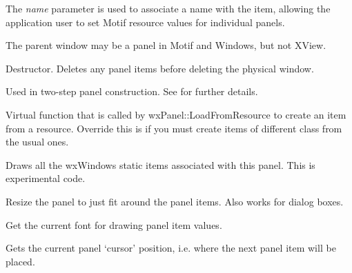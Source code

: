 The {\it name} parameter is used to associate a name with the item,
allowing the application user to set Motif resource values for
individual panels.

The parent window may be a panel in Motif and Windows, but not XView.



Destructor.  Deletes any panel items before deleting the physical window.



Used in two-step panel construction. See 
for further details.



Virtual function that is called by wxPanel::LoadFromResource to create an item from a resource.
Override this is if you must create items of different class from the usual ones.



Draws all the wxWindows static items associated with this panel. This is
experimental code.



Resize the panel to just fit around the panel items. Also works for dialog boxes.



Get the current font for drawing panel item values.



Gets the current panel `cursor' position, i.e. where the next panel item
will be placed.

